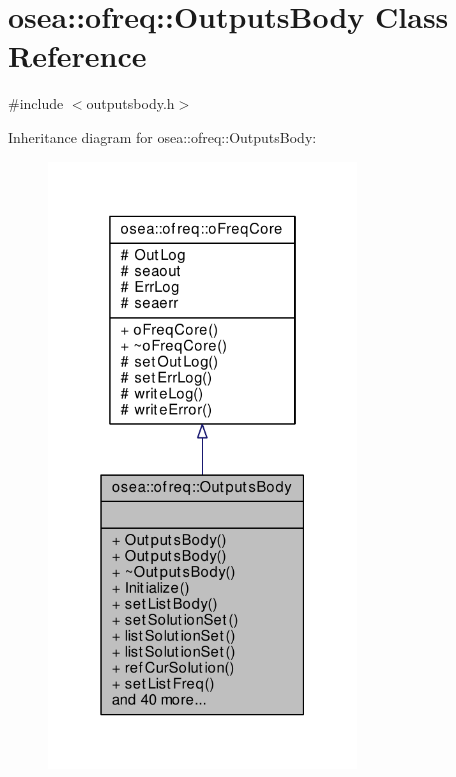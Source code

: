 \hypertarget{classosea_1_1ofreq_1_1_outputs_body}{\section{osea\-:\-:ofreq\-:\-:Outputs\-Body Class Reference}
\label{classosea_1_1ofreq_1_1_outputs_body}
}


{\ttfamily \#include $<$outputsbody.\-h$>$}



Inheritance diagram for osea\-:\-:ofreq\-:\-:Outputs\-Body\-:\nopagebreak
\begin{figure}[H]
\begin{center}
\leavevmode
\includegraphics[width=232pt]{classosea_1_1ofreq_1_1_outputs_body__inherit__graph}
\end{center}
\end{figure}
